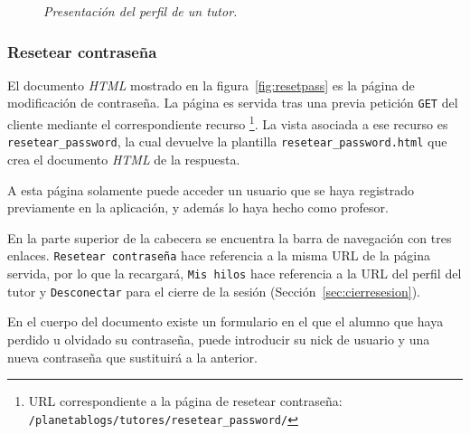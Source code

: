 \documentclass[a4paper, 12pt]{book}
\begin{document}
\begin{figure}
  \centering
  \caption{\textit{Presentaci\'on del perfil de un tutor.}}
  \label{fig:presentaciontutor}
\end{figure}


\subsubsection{Resetear contrase\~na} 
\label{sec:resetpass}
El documento \textit{HTML} mostrado en la figura~\ref{fig:resetpass} es la p\'agina de modificaci\'on de contrase\~na. La p\'agina es servida 
tras una previa petici\'on \texttt{GET} del cliente mediante el correspondiente recurso \footnote{URL correspondiente a la p\'agina de resetear contrase\~na: 
\texttt{/planetablogs/tutores/resetear\_password/}}. La vista asociada a ese recurso es \texttt{resetear\_password}, la cual devuelve la plantilla 
\texttt{resetear\_password.html} que crea el documento \textit{HTML} de la respuesta.

A esta p\'agina solamente puede acceder un usuario que se haya registrado previamente en la aplicaci\'on, y adem\'as lo haya hecho como profesor. 

En la parte superior de la cabecera se encuentra la barra de navegaci\'on con tres enlaces. \texttt{Resetear contrase\~na} hace referencia a la misma 
URL de la p\'agina servida, por lo que la recargar\'a, \texttt{Mis hilos} hace referencia a la URL del perfil del tutor y \texttt{Desconectar} para 
el cierre de la sesi\'on (Secci\'on~\ref{sec:cierresesion}).

En el cuerpo del documento existe un formulario en el que el alumno que haya perdido u olvidado su contrase\~na, puede introducir su nick de usuario y una
nueva contrase\~na que sustituir\'a a la anterior.
\end{document}
